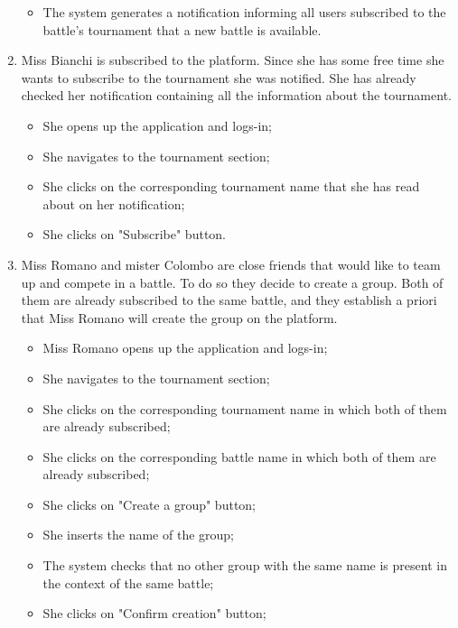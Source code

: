 \documentclass[../RASD.tex]{subfiles}
\begin{document}
\begin{enumerate}
{\begin{itemize}
                \item {The system generates a notification informing all users subscribed to the battle's tournament that a new battle is available.}
            \end{itemize}}
            \item {Miss Bianchi is subscribed to the platform.
            Since she has some free time she wants to subscribe to the tournament she was notified.
            She has already checked her notification containing all the information about the tournament.
            \begin{itemize}
                \item {She opens up the application and logs-in;}
                \item {She navigates to the tournament section;}
                \item {She clicks on the corresponding tournament name that she has read about on her notification;}
                \item {She clicks on "Subscribe" button.}
            \end{itemize}}
            \item {Miss Romano and mister Colombo are close friends that would like to team up and compete in a battle.
            To do so they decide to create a group.
            Both of them are already subscribed to the same battle, and they establish a priori that Miss Romano will create the group on the platform.
            \begin{itemize}
                \item {Miss Romano opens up the application and logs-in;}
                \item {She navigates to the tournament section;}
                \item {She clicks on the corresponding tournament name in which both of them are already subscribed;}
                \item {She clicks on the corresponding battle name in which both of them are already subscribed;}
                \item {She clicks on "Create a group" button;}
                \item {She inserts the name of the group;}
                \item {The system checks that no other group with the same name is present in the context of the same battle;}
                \item {She clicks on "Confirm creation" button;}

\end{itemize}}
\end{enumerate}
\end{document}
